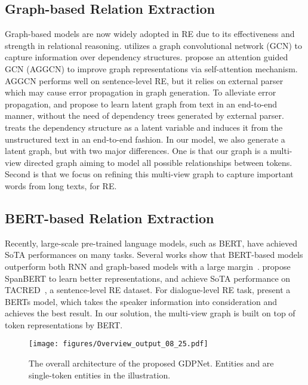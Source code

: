 \documentclass[letterpaper]{article} \usepackage{aaai21}  \usepackage{times}  \usepackage{helvet} \usepackage{courier}  \usepackage[hyphens]{url}  \usepackage{graphicx} \urlstyle{rm} \def\UrlFont{\rm}  \usepackage{graphicx}  \usepackage{natbib}  \usepackage{caption}
\begin{document}
\subsection{Graph-based Relation Extraction}
Graph-based models are now widely adopted in RE due to its effectiveness and strength in relational reasoning. \citet{zhang-etal-2018-graph} utilizes a graph convolutional network (GCN) to capture information over dependency structures. \citet{guo-etal-2019-attention} propose an attention guided GCN (AGGCN) to improve graph representations via self-attention mechanism.  AGGCN performs well on sentence-level RE, but it relies on external parser which may cause error propagation in graph generation. To alleviate error propagation, \citet{christopoulou-etal-2018-walk} and \citet{nan2020reasoning} propose to learn latent graph from text in an end-to-end manner, without the need of dependency trees generated by external parser. \citet{guo2020learning} treats the dependency structure as a latent variable and induces it from the unstructured text in an end-to-end fashion. In our model, we also generate a latent graph, but with two major differences. One is that our graph is a multi-view directed graph aiming to model all possible relationships between tokens. Second is that we focus on refining this multi-view graph to capture important words from long texts, for RE.


\subsection{BERT-based Relation Extraction}
Recently, large-scale pre-trained language models, such as BERT, have achieved SoTA performances on many tasks. Several works show that BERT-based models outperform both RNN and graph-based models with a large margin~\cite{wu2019enriching,joshi2020spanbert,yu-etal-2020-dialogue}. \citet{joshi2020spanbert} propose SpanBERT to learn better representations, and achieve SoTA performance on TACRED~\cite{zhang-etal-2017-position}, a sentence-level RE dataset. For dialogue-level RE task, \citet{yu-etal-2020-dialogue} present a BERTs model, which takes the speaker information into consideration and achieves the best result. In our solution, the multi-view graph is built on top of token representations by BERT.


\begin{figure*}
\centering
\texttt{[image: figures/Overview\_output\_08\_25.pdf]}
\caption{The overall architecture of the proposed GDPNet. Entities  and  are  single-token entities in the illustration. }
\label{fig:overview}
\end{figure*}
\end{document}
